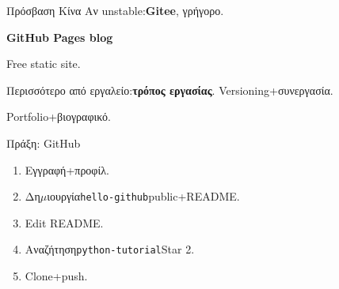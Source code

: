 \begin{tcbinfo}{Πρόσβαση Κίνα}
Αν unstable:\textbf{Gitee}, γρήγορο.

\end{tcbinfo}

\textbf{GitHub Pages blog}\par

Free static site.


Περισσότερο από εργαλείο:\textbf{τρόπος εργασίας}. Versioning+συνεργασία.

Portfolio+βιογραφικό.

\begin{tcbpractice}{Πράξη: GitHub}
\begin{enumerate}
  \item Εγγραφή+προφίλ.
  \item Δη$\mu$ιουργία\texttt{hello-\allowbreak github}public+README.
  \item Edit README.
  \item Αναζήτηση\texttt{python-\allowbreak tutorial}Star 2.
  \item Clone+push.
\end{enumerate}

\end{tcbpractice}
